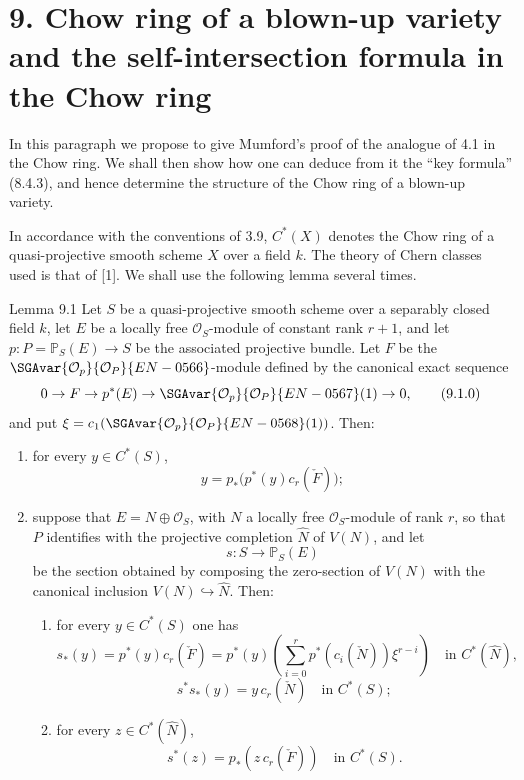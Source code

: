 \section*{9. Chow ring of a blown-up variety and the self-intersection formula in the Chow ring}

In this paragraph we propose to give Mumford's proof of the analogue of 4.1 in the Chow ring. We shall then show how one can deduce from it the ``key formula'' (8.4.3), and hence determine the structure of the Chow ring of a blown-up variety.

In accordance with the conventions of 3.9, $C^*(X)$ denotes the Chow ring of a quasi-projective smooth scheme $X$ over a field $k$. The theory of Chern classes used is that of [1]. We shall use the following lemma several times.

\begin{statement}{Lemma 9.1}
Let $S$ be a quasi-projective smooth scheme over a separably closed field $k$, let $E$ be a locally free $\mathcal O_S$-module of constant rank $r+1$, and let $p:P=\mathbb P_S(E)\to S$ be the associated projective bundle. Let $F$ be the $\SGAvar{\mathcal O_p}{\mathcal O_P}{EN-0566}$-module defined by the canonical exact sequence
\[
0\to F\to p^*(E)\to\SGAvar{\mathcal O_p}{\mathcal O_P}{EN-0567}(1)\to0,
\tag{9.1.0}
\]
and put $\xi=c_1(\SGAvar{\mathcal O_p}{\mathcal O_P}{EN-0568}(1))$. Then:
\begin{enumerate}[label=(\roman*)]
\item for every $y\in C^*(S)$,
\[
y=p_*\bigl(p^*(y)c_r(\check F)\bigr);
\tag{9.1.1}
\]
\item suppose that $E=N\oplus\mathcal O_S$, with $N$ a locally free $\mathcal O_S$-module of rank $r$, so that $P$ identifies with the projective completion $\widehat N$ of $V(N)$, and let
\[
s:S\to\mathbb P_S(E)
\]
be the section obtained by composing the zero-section of $V(N)$ with the canonical inclusion $V(N)\hookrightarrow\widehat N$. Then:
\begin{enumerate}[label=(\alph*)]
\item for every $y\in C^*(S)$ one has
\[
s_*(y)=p^*(y)c_r(\check F)=p^*(y)\left(\sum_{i=0}^r p^*(c_i(\check N))\xi^{r-i}\right)
\quad\text{in }C^*(\widehat N),
\tag{9.1.2}
\]
\[
s^*s_*(y)=y\,c_r(\check N)\quad\text{in }C^*(S);
\tag{9.1.3}
\]
\item for every $z\in C^*(\widehat N)$,
\[
s^*(z)=p_*(z\,c_r(\check F))\quad\text{in }C^*(S).
\tag{9.1.4}
\]
\end{enumerate}
\end{enumerate}
\end{statement}

